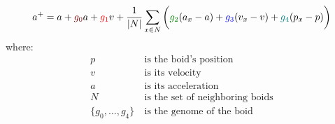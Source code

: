 \documentclass{article}
\newcommand*{\mathcolor}{}
\def\mathcolor#1#{\mathcoloraux{#1}}
\newcommand*{\mathcoloraux}[3]{%
  \protect\leavevmode
  \begingroup
    \color#1{#2}#3%
  \endgroup
}
\begin{document}
$$a^{+} = a + \mathcolor{maroon}{g_0}a + \mathcolor{red}{g_1}v + \frac {1} {\lvert N \rvert} \sum_{x \in N}\bigg(\mathcolor{green}{g_2}(a_x-a)+\mathcolor{blue}{g_3}(v_x-v)+\mathcolor{teal}{g_4}(p_x-p)\bigg)$$
where:\\
\begin{align*}
p&~ \text{is the boid's position}\\
v&~ \text{is its velocity}\\
a&~ \text{is its acceleration}\\
N&~ \text{is the set of neighboring boids}\\
\{g_0, \ldots, g_4\}&~ \text{is the genome of the boid}
\end{align*}
\end{document}
